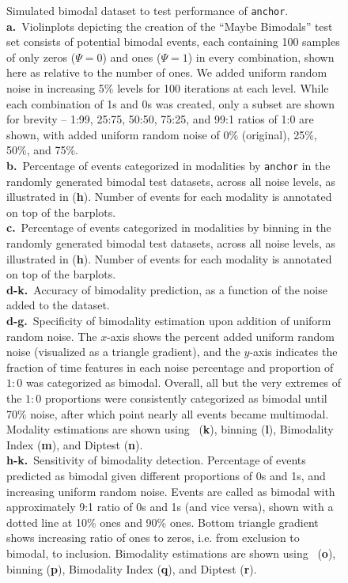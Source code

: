 \clearpage
\thispagestyle{facingcaption}
\begin{figure}[h]
\captionsetup{labelformat=prev-page}
\caption[Simulated ``Maybe Bimodals'' dataset to test performance of \texttt{anchor}.]{
Simulated bimodal dataset to test performance of \texttt{anchor}.\\
\textbf{a.}~Violinplots depicting the creation of the ``Maybe Bimodals'' test set consists of potential bimodal events, each containing 100 samples of only zeros ($\Psi = 0$) and ones ($\Psi = 1$) in every combination, shown here as relative to the number of ones. We added uniform random noise in increasing 5\% levels for 100 iterations at each level. While each combination of 1s and 0s was created, only a subset are shown for brevity -- 1:99, 25:75, 50:50, 75:25, and 99:1 ratios of 1:0 are shown, with added uniform random noise of 0\% (original), 25\%, 50\%, and 75\%.\\
\textbf{b.}~Percentage of events categorized in modalities by \texttt{anchor} in the randomly generated bimodal test datasets, across all noise levels, as illustrated in (\textbf{h}). Number of events for each modality is annotated on top of the barplots. \\
\textbf{c.}~Percentage of events categorized in modalities by binning in the randomly generated bimodal test datasets, across all noise levels, as illustrated in (\textbf{h}). Number of events for each modality is annotated on top of the barplots. \\
\textbf{d-k.}~Accuracy of bimodality prediction, as a function of the noise added to the dataset. \\
\textbf{d-g.}~Specificity of bimodality estimation upon addition of uniform random noise. The $x$-axis shows the percent added uniform random noise (visualized as a triangle gradient), and the $y$-axis indicates the fraction of time features in each noise percentage and proportion of $1:0$ was categorized as bimodal. Overall, all but the very extremes of the $1:0$ proportions were consistently categorized as bimodal until 70\% noise, after which point nearly all events became multimodal. Modality estimations are shown using \anchor\, (\textbf{k}), binning (\textbf{l}), Bimodality Index (\textbf{m}), and Diptest (\textbf{n}).\\
\textbf{h-k.}~Sensitivity of bimodality detection. Percentage of events predicted as bimodal given different proportions of 0s and 1s, and increasing uniform random noise. Events are called as bimodal with approximately 9:1 ratio of 0s and 1s (and vice versa), shown with a dotted line at 10\% ones and 90\% ones. Bottom triangle gradient shows increasing ratio of ones to zeros, i.e. from exclusion to bimodal, to inclusion. Bimodality estimations are shown using \anchor\, (\textbf{o}), binning (\textbf{p}), Bimodality Index (\textbf{q}), and Diptest (\textbf{r}).
}
\label{fig:anchor_simulations_maybe_bimodals}
\end{figure}

